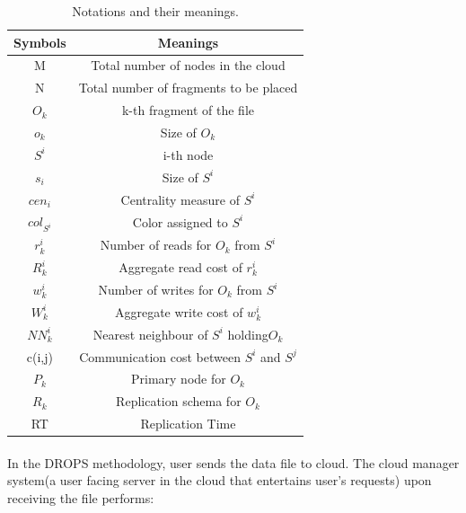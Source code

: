\begin{table}
	\begin{center}
		\begin{tabular}{|c|c|} 
			\hline %
			Symbols & Meanings \\
			\hline
			M & Total number of nodes in the cloud \\
			\hline
			N & Total number of fragments to be placed \\
			\hline
			{$O_k$} & k-th fragment of the file \\
			\hline
			{$o_k$} & Size of {$O_k$} \\
			\hline
			{$S^i$} & i-th node \\
			\hline
			{$s_i$} & Size of {$S^i$}  \\
			\hline
			{$cen_i$} & Centrality measure of {$S^i$} \\
			\hline
			{$col_{S^i}$} & Color assigned to {$S^i$} \\								\hline
			{$r^i_k$} & Number of reads for {$O_k$} from {$S^i$} \\		
			\hline
			{$R^i_k$} & Aggregate read cost of  {$r^i_k$} \\		
			\hline
			{$w^i_k$} & Number of writes for {$O_k$} from {$S^i$} \\
			\hline
			{$W^i_k$} & Aggregate write cost of  {$w^i_k$} \\
			\hline
			{$N N^i_k$} & Nearest neighbour of {$S^i$} holding{$O_k$} \\
			\hline
			c(i,j) & Communication cost between {$S^i$} and {$S^j$} \\
			\hline
			{$P_k$} & Primary node for {$O_k$} \\
			\hline
			{$R_k$} & Replication schema for {$O_k$} \\
			\hline
			RT & Replication Time \\
			\hline
			
		\end{tabular}
		\caption{Notations and their meanings.}
	\end{center}
\end{table}


\paragraph*{}
\newpage
In the DROPS methodology, user sends the data file to cloud. The cloud manager
system(a user facing server in the cloud that entertains user’s requests) upon receiving the file performs:

